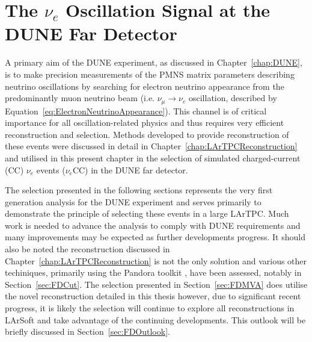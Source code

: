 
\chapter{The $\nu_e$ Oscillation Signal at the DUNE Far Detector}\label{chap:FDAnalysis}

A primary aim of the DUNE experiment, as discussed in Chapter~\ref{chap:DUNE}, is to make precision measurements of the PMNS matrix parameters describing neutrino oscillations by searching for electron neutrino appearance from the predominantly muon neutrino beam (i.e. $\nu_{\mu} \rightarrow \nu_e$ oscillation, described by Equation~\ref{eq:ElectronNeutrinoAppearance}).  This channel is of critical importance for all oscillation-related physics and thus requires very efficient reconstruction and selection.  Methods developed to provide reconstruction of these events were discussed in detail in Chapter~\ref{chap:LArTPCReconstruction} and utilised in this present chapter in the selection of simulated charged-current (CC) $\nu_e$ events ($\nu_e$CC) in the DUNE far detector.

The selection presented in the following sections represents the very first generation analysis for the DUNE experiment and serves primarily to demonstrate the principle of selecting these events in a large LArTPC.  Much work is needed to advance the analysis to comply with DUNE requirements and many improvements may be expected as further developments progress.  It should also be noted the reconstruction discussed in Chapter~\ref{chap:LArTPCReconstruction} is not the only solution and various other techiniques, primarily using the Pandora toolkit \cite{Pandora2015}, have been assessed, notably in Section~\ref{sec:FDCut}.  The selection presented in Section~\ref{sec:FDMVA} does utilise the novel reconstruction detailed in this thesis however, due to significant recent progress, it is likely the selection will continue to explore all reconstructions in LArSoft and take advantage of the continuing developments.  This outlook will be briefly discussed in Section~\ref{sec:FDOutlook}.

